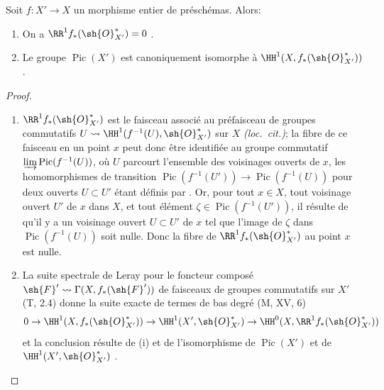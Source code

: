 \begin{corollary}[21.8.2]
\label{IV.21.8.2}
Soit $f:X'\to X$ un morphisme entier de préschémas.
Alors:
\begin{enumerate}[label=\textup{(\roman*)}]
  \item On a $\RR^1 f_*(\sh{O}^*_{X'})=0$ .
  \item Le groupe $\operatorname{Pic}(X')$ est canoniquement isomorphe à $\HH^1(X,f_*(\sh{O}^*_{X'}))$.
\end{enumerate}
\end{corollary}

\begin{proof}
\begin{enumerate}[label=(\roman*)]
  \item $\RR^1 f_*(\sh{O}^*_{X'})$ est le faisceau associé au préfaisceau de groupes commutatifs $U\leadsto\HH^1(f^{-1}(U),\sh{O}^*_{X'})$ sur $X$ \emph{(loc.\ cit.)};
la fibre de ce faisceau en un point $x$ peut donc  être identifiée au groupe commutatif $\varinjlim\operatorname{Pic}(f^{-1}(U))$, où $U$ parcourt l'ensemble des voisinages ouverts de $x$, les homomorphismes de transition $\operatorname{Pic}(f^{-1}(U'))\to\operatorname{Pic}(f^{-1}(U))$ pour deux ouverts $U\subset U'$ étant définis par .
Or, pour tout $x\in X$, tout voisinage ouvert $U'$ de $x$ dans $X$, et tout élément $\zeta\in\operatorname{Pic}(f^{-1}(U'))$, il résulte de  qu'il y a un voisinage ouvert $U\subset U'$ de $x$ tel que l'image de $\zeta$ dans $\operatorname{Pic}(f^{-1}(U))$ soit nulle.
Donc la fibre de $\RR^1f_*(\sh{O}^*_{X'})$ au point $x$ est nulle.

  \item La suite spectrale de Leray pour le foncteur composé $\sh{F}'\leadsto\Gamma(X,f_*(\sh{F}'))$ de faisceaux de groupes commutatifs sur $X'$ (T, 2.4) donne la suite exacte de termes de bas degré (M, XV, 6)
\[
  0\to\HH^1(X,f_*(\sh{O}^*_{X'}))\to\HH^1(X',\sh{O}^*_{X'})\to\HH^0(X,\RR^1f_*(\sh{O}^*_{X'}))
\]
et la conclusion résulte de (i) et de l'isomorphisme de $\operatorname{Pic}(X')$ et de $\HH^1(X',\sh{O}^*_{X'})$ .
\end{enumerate}
\end{proof}

